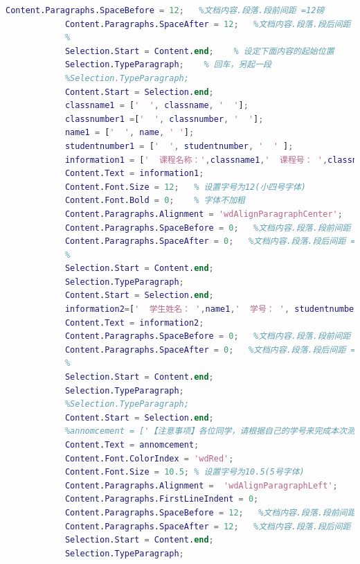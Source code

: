 \begin{lstlisting}[language=Matlab]
            Content.Paragraphs.SpaceBefore = 12;   %文档内容.段落.段前间距 =12磅
            Content.Paragraphs.SpaceAfter = 12;   %文档内容.段落.段后间距 =12磅
            %
            Selection.Start = Content.end;    % 设定下面内容的起始位置
            Selection.TypeParagraph;    % 回车，另起一段
            %Selection.TypeParagraph;
            Content.Start = Selection.end;
            classname1 = ['  ', classname, '  '];
            classnumber1 =['  ', classnumber, '  '];
            name1 = ['  ', name, ' '];
            studentnumber1 = ['  ', studentnumber, '  ' ];
            information1 = ['  课程名称：',classname1,'  课程号： ',classnumber1];
            Content.Text = information1;
            Content.Font.Size = 12;   % 设置字号为12(小四号字体)
            Content.Font.Bold = 0;    % 字体不加粗
            Content.Paragraphs.Alignment = 'wdAlignParagraphCenter';    % 居中对齐
            Content.Paragraphs.SpaceBefore = 0;   %文档内容.段落.段前间距 =0磅
            Content.Paragraphs.SpaceAfter = 0;   %文档内容.段落.段后间距 =0磅
            %
            Selection.Start = Content.end;
            Selection.TypeParagraph;
            Content.Start = Selection.end;
            information2=['  学生姓名： ',name1,'  学号： ', studentnumber1];
            Content.Text = information2;
            Content.Paragraphs.SpaceBefore = 0;   %文档内容.段落.段前间距 =0磅
            Content.Paragraphs.SpaceAfter = 0;   %文档内容.段落.段后间距 =0磅
            %
            Selection.Start = Content.end;
            Selection.TypeParagraph;
            %Selection.TypeParagraph;
            Content.Start = Selection.end;
            %annomcement = ['【注意事项】各位同学，请根据自己的学号来完成本次测试题(见以学号命名的压缩包中，包括试卷、数据和答案表)，将答案(数值题保留四位小数、非数值题见各大题要求)填写在EXCEL工作薄中相应的单元格中，并在规定的时间内提交以自己学号命名的EXCEL工作薄。在计算相关的统计量及其P值时均不采用连续性修正！'];
            Content.Text = annomcement;
            Content.Font.ColorIndex = 'wdRed';
            Content.Font.Size = 10.5; % 设置字号为10.5(5号字体)
            Content.Paragraphs.Alignment =  'wdAlignParagraphLeft';
            Content.Paragraphs.FirstLineIndent = 0;
            Content.Paragraphs.SpaceBefore = 12;   %文档内容.段落.段前间距 =12磅
            Content.Paragraphs.SpaceAfter = 12;   %文档内容.段落.段后间距 =12磅
            Selection.Start = Content.end;
            Selection.TypeParagraph;
            \end{lstlisting}
